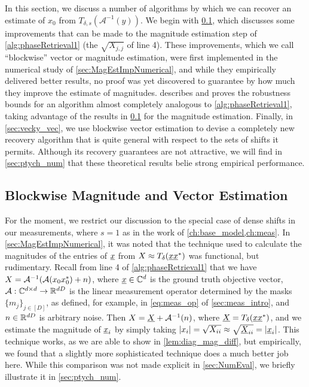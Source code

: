 In this section, we discuss a number of algorithms by which we can recover an estimate of $x_0$ from $T_{\delta, s}(\mathcal{A}^{-1}(y))$.  We begin with \cref{sec:blocky_block}, which discusses some improvements that can be made to the magnitude estimation step of \cref{alg:phaseRetrieval1} (the $\sqrt{X_{j,j}}$ of line 4).  These improvements, which we call ``blockwise'' vector or magnitude estimation, were first implemented in the numerical study of \cref{sec:MagEstImpNumerical}, and while they empirically delivered better results, no proof was yet discovered to guarantee by how much they improve the estimate of magnitudes.   describes and proves the robustness bounds for an algorithm almost completely analogous to \cref{alg:phaseRetrieval1}, taking advantage of the results in \cref{sec:blocky_block} for the magnitude estimation.  Finally, in \cref{sec:vecky_vec}, we use blockwise vector estimation to devise a completely new recovery algorithm that is quite general with respect to the sets of shifts it permits.  Although its recovery guarantees are not attractive, we will find in \cref{sec:ptych_num} that these theoretical results belie strong empirical performance.

\subsection{Blockwise Magnitude and Vector Estimation}
\label{sec:blocky_block}
For the moment, we restrict our discussion to the special case of dense shifts in our measurements, where $s = 1$ as in the work of \cref{ch:base_model,ch:meas}.  In \cref{sec:MagEstImpNumerical}, it was noted that the technique used to calculate the magnitudes of the entries of $\underline{x}$ from $X \approx T_\delta(\underline{x} \underline{x}^*)$ was functional, but rudimentary.  Recall from line 4 of \cref{alg:phaseRetrieval1} that we have $X = \mathcal{A}^{-1}(\mathcal{A}(x_0 x_0^*) + n)$, where $\underline{x} \in \mathbb{C}^d$ is the ground truth objective vector, $\mathcal{A} : \mathbb{C}^{d \times d} \to \mathbb{R}^{d D}$ is the linear measurement operator determined by the masks $\{m_j\}_{j \in [D]}$, as defined, for example, in \eqref{eq:meas_op} of \cref{sec:meas_intro}, and $n \in \mathbb{R}^{d D}$ is arbitrary noise.  Then $X = \underline{X} + \mathcal{A}^{-1}(n)$, where $\underline{X} = T_\delta(\underline{x} \underline{x}^*)$, and we estimate the magnitude of $\underline{x}_i$ by simply taking $\lvert x_i\rvert = \sqrt{X_{ii}} \approx \sqrt{\underline{X}_{ii}} = \lvert\underline{x}_i\rvert$.  This technique works, as we are able to show in \cref{lem:diag_mag_diff}, but empirically, we found that a slightly more sophisticated technique does a much better job here.  While this comparison was not made explicit in \cref{sec:NumEval}, we briefly illustrate it in \cref{sec:ptych_num}.

